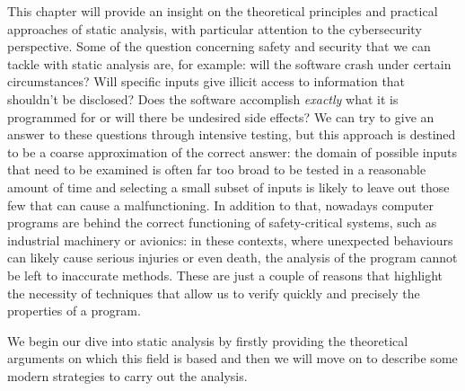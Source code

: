 \documentclass[12pt,a4paper]{book}
\theoremstyle{definition}
\begin{document}
	This chapter will provide an insight on the theoretical principles and practical approaches of static analysis, with particular attention to the cybersecurity perspective. Some of the question concerning safety and security that we can tackle with static analysis are, for example: will the software crash under certain circumstances? Will specific inputs give illicit access to information that shouldn't be disclosed? Does the software accomplish \textit{exactly} what it is programmed for or will there be undesired side effects? We can try to give an answer to these questions through intensive testing, but this approach is destined to be a coarse approximation of the correct answer: the domain of possible inputs that need to be examined is often far too broad to be tested in a reasonable amount of time and selecting a small subset of inputs is likely to leave out those few that can cause a malfunctioning. In addition to that, nowadays computer programs are behind the correct functioning of safety-critical systems, such as industrial machinery or avionics: in these contexts, where unexpected behaviours can likely cause serious injuries or even death, the analysis of the program cannot be left to inaccurate methods. These are just a couple of reasons that highlight the necessity of techniques that allow us to verify quickly and precisely the properties of a program.
	
	We begin our dive into static analysis by firstly providing the theoretical arguments on which this field is based and then we will move on to describe some modern strategies to carry out the analysis.
\end{document}
